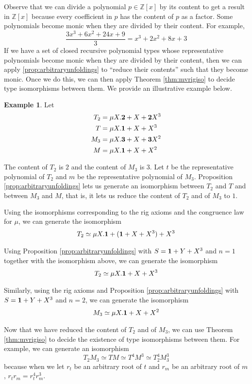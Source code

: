 \documentclass{msthesis}
\theoremstyle{definition}
\newtheorem{example}[theorem]{Example}
\newcommand{\ints}{\mathbb{Z}}
\begin{document}
Observe that we can divide a polynomial $p \in \ints[x]$ by its content to get a result in $\ints[x]$ because every coefficient in $p$ has the content of $p$ as a factor.  Some polynomials become monic when they are divided by their content.  For example,
\[ \frac{3x^3 + 6x^2 + 24x + 9}{3} = x^3 + 2x^2 + 8x + 3\]
If we have a set of closed recursive polynomial types whose representative polynomials become monic when they are divided by their content, then we can apply \ref{prop:arbitraryunfoldings} to ``reduce their contents'' such that they become monic.  Once we do this, we can then apply Theorem \ref{thm:mvrigiso} to decide type isomorphisms between them.  We provide an illustrative example below.
\begin{example}
    Let 
    \begin{align*}
        T_2 &= \mu X.\mathbf{2} + X + \mathbf{2}X^3 \\
        T &= \mu X.\mathbf{1} + X + X^3 \\
        M_3 &= \mu X.\mathbf{3} + X + \mathbf{3}X^2 \\
        M &= \mu X. \mathbf{1} + X + X^2
    \end{align*}

    
    The content of $T_2$ is $2$ and the content of $M_3$ is $3$.  Let $t$ be the representative polynomial of $T_2$ and $m$ be the representative polynomial of $M_3$.  Proposition \ref{prop:arbitraryunfoldings} lets us generate an isomorphism between $T_2$ and $T$ and between $M_3$ and $M$, that is, it lets us reduce the content of $T_2$ and of $M_3$ to $1$.

    Using the isomorphisms corresponding to the rig axioms and the congruence law for $\mu$, we can generate the isomorphism
    \[ T_2 \simeq \mu X. \mathbf{1} + (\mathbf{1} + X + X^3) + X^3\]

    Using Proposition \ref{prop:arbitraryunfoldings} with $S = \mathbf{1} + Y + X^3$ and $n = 1$ together with the isomorphism above, we can generate the isomorphism
    \[ T_2 \simeq \mu X.\mathbf{1} + X + X^3\]

    Similarly, using the rig axioms and Proposition \ref{prop:arbitraryunfoldings} with $S = \mathbf{1} + Y + X^3$ and $n = 2$, we can generate the isomorphism
    \[ M_3 \simeq \mu X. \mathbf{1} + X + X^2\]

    Now that we have reduced the content of $T_2$ and of $M_3$, we can use Theorem \ref{thm:mvrigiso} to decide the existence of type isomorphisms between them.  For example, we can generate an isomorphism
    \[ T_2M_3 \simeq TM \simeq T^4M^3 \simeq T_2^4M^3_3 \]
    because when we let $r_t$ be an arbitrary root of $t$ and $r_m$ be an arbitrary root of $m$, $r_tr_m = r_t^4r_m^3$.
\end{example}
\end{document}
